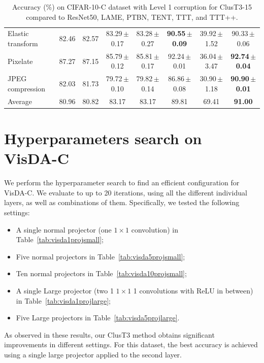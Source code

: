 \documentclass{article}
\newcommand{\ppm}{\,\scriptsize$\pm$}
\begin{document}
\begin{table}[!t]
\begin{small}
{\begin{tabular}{l|ccccccc}
        Elastic transform & 82.46 & 82.57 & 83.29\ppm0.17 & 83.28\ppm0.27 & \textbf{90.55\ppm0.09} & 39.92\ppm1.52 & 90.33\ppm0.06 \\ 
        Pixelate & 87.27 & 87.15 & 85.79\ppm0.12 & 85.81\ppm0.17 & 92.24\ppm0.01 & 36.04\ppm3.47 & \textbf{92.74\ppm0.04} \\ 
        JPEG compression & 82.03 & 81.73 & 79.72\ppm0.10 & 79.82\ppm0.14 & 86.86\ppm0.08 & 30.90\ppm1.18 & \textbf{90.90\ppm0.01} \\ \midrule
        Average & 80.96 & 80.82 & 83.17 & 83.17 & 89.81 & 69.41 & \textbf{91.00} \\ \bottomrule
    \end{tabular}}
    \end{small}
    \caption{Accuracy (\%) on CIFAR-10-C dataset with Level 1 corruption for ClusT3-15 compared to ResNet50, LAME, PTBN, TENT, TTT, and TTT++.}
	\label{tab:Cifar10cComparisonL1}
\end{table}

\section{Hyperparameters search on VisDA-C}

We perform the hyperparameter search to find an efficient configuration for VisDA-C. We evaluate to up to 20 iterations, using all the different individual layers, as well as combinations of them. Specifically, we tested the following settings: 
\begin{itemize}
    \item A single normal projector (one $1\times1$ convolution) in Table~\ref{tab:visda1projsmall};
    \item Five normal projectors in Table~\ref{tab:visda5projsmall};
    \item Ten normal projectors in Table~\ref{tab:visda10projsmall};
    \item A single Large projector (two 1 $1\times1$ 1 convolutions with ReLU in between) in Table~\ref{tab:visda1projlarge};
    \item Five Large projectors in Table~\ref{tab:visda5projlarge}.
\end{itemize}
As observed in these results, our ClusT3 method obtains significant improvements in different settings. For this dataset, the best accuracy is achieved using a single large projector applied to the second layer.
\end{document}
